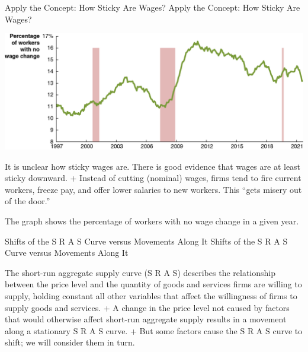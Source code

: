 \documentclass[
  12pt,
  ignorenonframetext,
]{beamer}
\begin{document}
\begin{frame}{Apply the Concept: How Sticky Are Wages?}
\protect\hypertarget{apply-the-concept-how-sticky-are-wages}{}
Apply the Concept: How Sticky Are Wages?

\includegraphics[width=\textwidth,height=0.99\textheight]{imgs3/img_slide24a.png}

It is unclear how sticky wages are. There is good evidence that wages
are at least sticky downward. + Instead of cutting (nominal) wages,
firms tend to fire current workers, freeze pay, and offer lower salaries
to new workers. This ``gets misery out of the door.''

The graph shows the percentage of workers with no wage change in a given
year.
\end{frame}

\begin{frame}{Shifts of the S R A S Curve versus Movements Along It}
\protect\hypertarget{shifts-of-the-s-r-a-s-curve-versus-movements-along-it}{}
Shifts of the S R A S Curve versus Movements Along It

The short-run aggregate supply curve (S R A S) describes the
relationship between the price level and the quantity of goods and
services firms are willing to supply, holding constant all other
variables that affect the willingness of firms to supply goods and
services. + A change in the price level not caused by factors that would
otherwise affect short-run aggregate supply results in a movement along
a stationary S R A S curve. + But some factors cause the S R A S curve
to shift; we will consider them in turn.
\end{frame}
\end{document}
